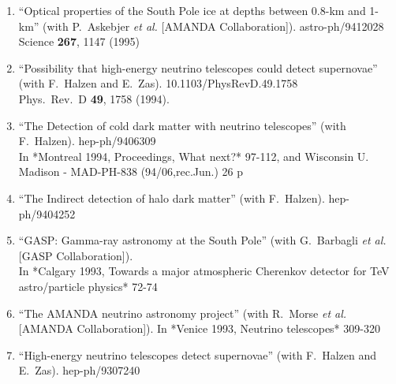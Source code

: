 \begin{enumerate}


\item ``Optical properties of the South Pole ice at depths between 0.8-km and 1-km'' (with P.~Askebjer {\it et al.}  [AMANDA Collaboration]). astro-ph/9412028
  \\{}Science {\bf 267}, 1147 (1995) %


\item ``Possibility that high-energy neutrino telescopes could detect supernovae'' (with F.~Halzen and E.~Zas). 10.1103/PhysRevD.49.1758
\\{}Phys.\ Rev.\ D {\bf 49}, 1758 (1994). %


\item ``The Detection of cold dark matter with neutrino telescopes'' (with F.~Halzen). hep-ph/9406309
  \\{}In *Montreal 1994, Proceedings, What next?* 97-112, and Wisconsin U. Madison - MAD-PH-838 (94/06,rec.Jun.) 26 p %


\item ``The Indirect detection of halo dark matter'' (with F.~Halzen). hep-ph/9404252
  


\item ``GASP: Gamma-ray astronomy at the South Pole'' (with G.~Barbagli {\it et al.}  [GASP Collaboration]). 
\\{}In *Calgary 1993, Towards a major atmospheric Cherenkov detector for TeV astro/particle physics* 72-74 %


\item ``The AMANDA neutrino astronomy project'' (with R.~Morse {\it et al.}  [AMANDA Collaboration]). In *Venice 1993, Neutrino telescopes* 309-320 %


\item ``High-energy neutrino telescopes detect supernovae'' (with F.~Halzen and E.~Zas). hep-ph/9307240
  



\end{enumerate}
